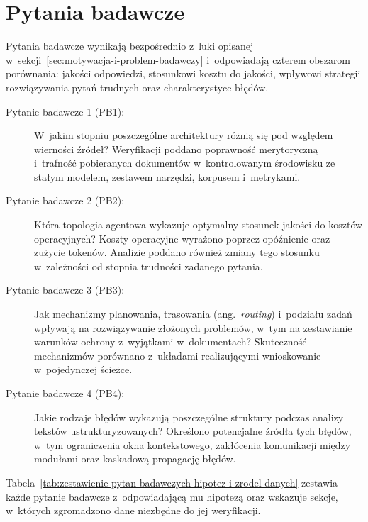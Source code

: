 \clearpage{}

\section{Pytania badawcze}\label{sec:pytania-badawcze}

Pytania badawcze wynikają bezpośrednio z~luki opisanej
w~\hyperref[sec:motywacja-i-problem-badawczy]{sekcji~\ref*{sec:motywacja-i-problem-badawczy}}
i~odpowiadają czterem obszarom porównania: jakości odpowiedzi, stosunkowi
kosztu do jakości, wpływowi strategii rozwiązywania pytań trudnych oraz
charakterystyce błędów.

\begin{description}
  \item[Pytanie badawcze 1 (PB1):] W~jakim stopniu poszczególne architektury różnią się
    pod względem wierności źródeł? Weryfikacji poddano poprawność merytoryczną
    i~trafność pobieranych dokumentów w~kontrolowanym środowisku ze stałym modelem,
    zestawem narzędzi, korpusem i~metrykami.

  \item[Pytanie badawcze 2 (PB2):] Która topologia agentowa wykazuje optymalny stosunek
    jakości do kosztów operacyjnych? Koszty operacyjne wyrażono poprzez opóźnienie
    oraz zużycie tokenów. Analizie poddano również zmiany tego stosunku
    w~zależności od stopnia trudności zadanego pytania.

  \item[Pytanie badawcze 3 (PB3):] Jak mechanizmy planowania, trasowania
    (ang.~\textit{routing}) i~podziału zadań wpływają na rozwiązywanie złożonych
    problemów, w~tym na zestawianie warunków ochrony z~wyjątkami w~dokumentach?
    Skuteczność mechanizmów porównano z~układami realizującymi wnioskowanie
    w~pojedynczej ścieżce.

  \item[Pytanie badawcze 4 (PB4):] Jakie rodzaje błędów wykazują poszczególne struktury
    podczas analizy tekstów ustrukturyzowanych? Określono potencjalne źródła tych
    błędów, w~tym ograniczenia okna kontekstowego, zakłócenia komunikacji między
    modułami oraz kaskadową propagację błędów.
\end{description}

Tabela~\ref{tab:zestawienie-pytan-badawczych-hipotez-i-zrodel-danych} zestawia
każde pytanie badawcze z~odpowiadającą mu hipotezą oraz wskazuje sekcje,
w~których zgromadzono dane niezbędne do jej weryfikacji.

